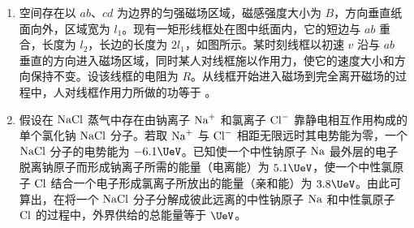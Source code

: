 \documentclass[\gkver]{gaokaozhenti}
\begin{document}
\begin{enumerate}


\item
空间存在以 $ab$、$cd$ 为边界的匀强磁场区域，磁感强度大小为 $B$，方向垂直纸面向外，区域宽为 $l_{1}$。现有一矩形线框处在图中纸面内，它的短边与 $ab$ 重合，长度为 $l_{2}$，长边的长度为 $2l_{1}$，如图所示。某时刻线框以初速 $v$ 沿与 $ab$ 垂直的方向进入磁场区域，同时某人对线框施以作用力，使它的速度大小和方向保持不变。设该线框的电阻为 $R$。从线框开始进入磁场到完全离开磁场的过程中，人对线框作用力所做的功等于 。



\item
假设在 $\ce{NaCl}$ 蒸气中存在由钠离子 $\ce{Na+}$ 和氯离子 $\ce{Cl-}$ 靠静电相互作用构成的单个氯化钠 $\ce{NaCl}$ 分子。若取 $\ce{Na+}$ 与 $\ce{Cl-}$ 相距无限远时其电势能为零，一个 $\ce{NaCl}$ 分子的电势能为 $-6.1\UeV$。已知使一个中性钠原子 $\ce{Na}$ 最外层的电子脱离钠原子而形成钠离子所需的能量（电离能）为 $5.1\UeV$，使一个中性氯原子 $\ce{Cl}$ 结合一个电子形成氯离子所放出的能量（亲和能）为 $3.8\UeV$。由此可算出，在将一个 $\ce{NaCl}$ 分子分解成彼此远离的中性钠原子 $\ce{Na}$ 和中性氯原子 $\ce{Cl}$ 的过程中，外界供给的总能量等于  $\UeV$。


\end{enumerate}
\end{document}
